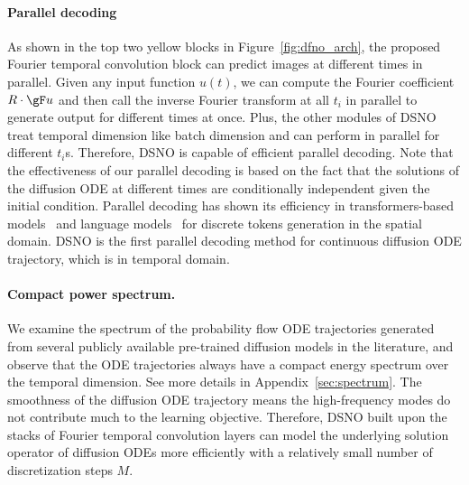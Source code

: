 \paragraph{Parallel decoding}
As shown in the top two yellow blocks in Figure~\ref{fig:dfno_arch}, the proposed Fourier temporal convolution block can predict images at different times in parallel. 
Given any input function $u(t)$, we can compute the Fourier coefficient $R\cdot \gF u$ and then call the inverse Fourier transform at all $t_i$ in parallel to generate output for different times at once. 
Plus, the other modules of DSNO treat temporal dimension like batch dimension and can perform in parallel for different $t_i$s. Therefore, DSNO is capable of efficient parallel decoding. 
Note that the effectiveness of our parallel decoding is based on the fact that the solutions of the diffusion ODE at different times are conditionally independent given the initial condition. Parallel decoding has shown its efficiency in transformers-based models~\cite{chang2023muse} and language models~\cite{ghazvininejad2019mask} for discrete tokens generation in the spatial domain. DSNO is the first parallel decoding method for continuous diffusion ODE trajectory, which is in temporal domain.   

\vspace{-0.1in}
\paragraph{Compact power spectrum.}
We examine the spectrum of the probability flow ODE trajectories generated from several publicly available pre-trained diffusion models in the literature, and observe that the ODE trajectories always have a compact energy spectrum over the temporal dimension. See more details in Appendix~\ref{sec:spectrum}. 
The smoothness of the diffusion ODE trajectory means the high-frequency modes do not contribute much to the learning objective. Therefore, DSNO built upon the stacks of Fourier temporal convolution layers can model the underlying solution operator of diffusion ODEs more efficiently with a relatively small number of discretization steps $M$. 


